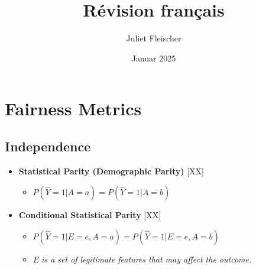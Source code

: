 \documentclass[12pt,a4paper]{article}
\title{Révision français}
\author{Juliet Fleischer}
\date{Januar 2025}
\begin{document}
\section*{Fairness Metrics}

\subsection*{Independence}
\begin{itemize}[leftmargin=2em]
    \item \textbf{Statistical Parity (Demographic Parity)} \hfill [XX]
    \begin{itemize}
        \item $P(\hat{Y} = 1 | A = a) = P(\hat{Y} = 1 | A = b)$
    \end{itemize}

    \item \textbf{Conditional Statistical Parity} \hfill [XX]
    \begin{itemize}
        \item $P(\hat{Y} = 1 | E = e, A = a) = P(\hat{Y} = 1 | E = e, A = b)$
        \item \textit{E is a set of legitimate features that may affect the outcome.}
    \end{itemize}
\end{itemize}
\end{document}
